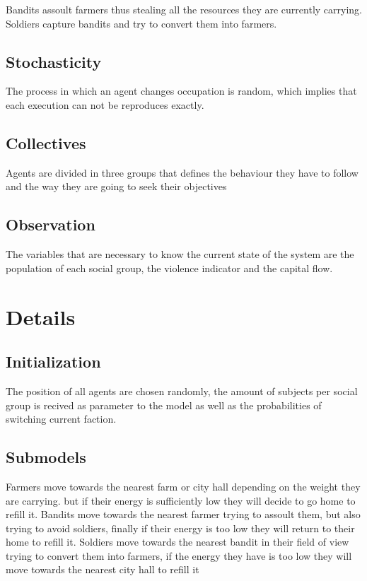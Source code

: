 \documentclass{wscpaperproc}
\theoremstyle{wsc}
\begin{document}
Bandits assoult farmers thus stealing all the resources they are currently
carrying. Soldiers capture bandits and try to convert them into farmers.

\subsection{Stochasticity}

The process in which an agent changes occupation is random, which implies that
each execution can not be reproduces exactly.

\subsection{Collectives}

Agents are divided in three groups that defines the behaviour they have to
follow and the way they are going to seek their objectives

\subsection{Observation}

The variables that are necessary to know the current state of the system are
the population of each social group, the violence indicator and the capital
flow.

\section{Details}

\subsection{Initialization}

The position of all agents are chosen randomly, the amount of subjects per
social group is recived as parameter to the model as well as the probabilities
of switching current faction.

\subsection{Submodels}

Farmers move towards the nearest farm or city hall depending on the weight they
are carrying. but if their energy is sufficiently low they will decide to go
home to refill it. Bandits move towards the nearest farmer trying to assoult
them, but also trying to avoid soldiers, finally if their energy is too low
they will return to their home to refill it. Soldiers move towards the nearest
bandit in their field of view trying to convert them into farmers, if the
energy they have is too low they will move towards the nearest city hall to
refill it
\end{document}
